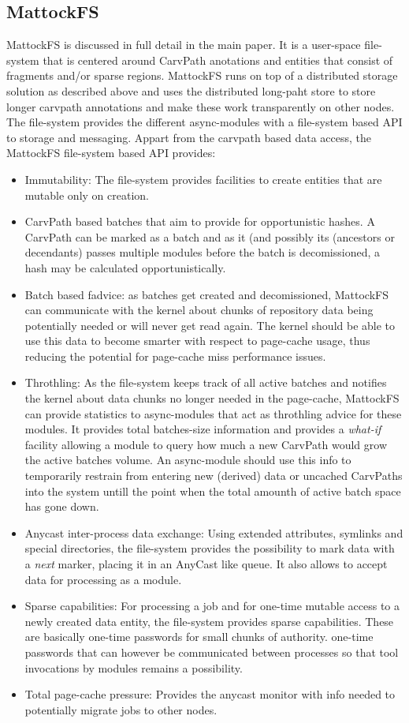 \subsection{MattockFS}
MattockFS is discussed in full detail in the main paper. It is a user-space file-system that is centered around CarvPath anotations and entities that consist of fragments and/or sparse regions. MattockFS runs on top of a distributed storage solution as described above and uses the distributed long-paht store to store longer carvpath annotations and make these work transparently on other nodes. The file-system provides the different async-modules with a file-system based API to storage and messaging. Appart from the carvpath based data access, the MattockFS file-system based API provides:
\begin{itemize}
\item Immutability: The file-system provides facilities to create entities that are mutable only on creation.
\item CarvPath based batches that aim to provide for opportunistic hashes. A CarvPath can be marked as a batch and as it (and possibly its (ancestors or decendants) passes multiple modules before the batch is decomissioned, a hash may be calculated opportunistically.
\item Batch based fadvice: as batches get created and decomissioned, MattockFS can communicate with the kernel about chunks of repository data being potentially needed or will never get read again. The kernel should be able to use this data to become smarter with respect to page-cache usage, thus reducing the potential for page-cache miss performance issues.
\item Throthling: As the file-system keeps track of all active batches and notifies the kernel about data chunks no longer needed in the page-cache, MattockFS can provide statistics to async-modules that act as throthling advice for these modules. It provides total batches-size information and provides a \emph{what-if} facility allowing a module to query how much a new CarvPath would grow the active batches volume. An async-module should use this info to temporarily restrain from entering new (derived) data or uncached CarvPaths into the system untill the point when the total amounth of active batch space has gone down. 
\item Anycast inter-process data exchange: Using extended attributes, symlinks and special directories, the file-system provides the possibility to mark data with a \emph{next} marker, placing it in an AnyCast like queue. It also allows to accept data for processing as a module.
\item Sparse capabilities: For processing a job and for one-time mutable access to a newly created data entity, the file-system provides sparse capabilities. These are basically one-time passwords for small chunks of authority. one-time passwords that can however be communicated between processes so that tool invocations by modules remains a possibility.
\item Total page-cache pressure: Provides the anycast monitor with info needed to potentially migrate jobs to other nodes.
\end{itemize}
